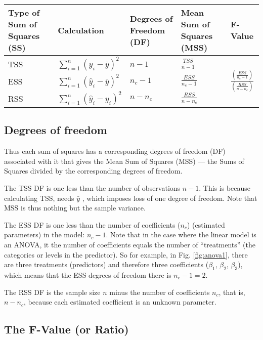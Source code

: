 \begin{center}
\def\arraystretch{1.5}
\begin{tabular}{|>{\centering}m{2cm}|>{\centering}m{2.1cm}|>{\centering}m{2cm}|>{\centering}m{2cm}|p{1.5cm}|}
\hline
Type of Sum of Squares (SS)  & Calculation & Degrees of Freedom (DF) & 
Mean Sum of Squares (MSS) & F-Value \\ \hline

TSS & $\sum_{i=1}^{n}(y_i - \bar{y})^2$   & $n-1$ &$\frac{TSS}{n-1}$& 
\multirow{3}{*}{ 
$\frac{\left(\frac{ESS}{n_c-1}\right)}{\left(\frac{RSS}{n-n_c}\right)}$} \\ \cline{1-4}

ESS & $\sum_{i=1}^{n} (\hat{y}_i - \bar{y})^2$ & $n_c-1$ & $\frac{ESS}{n_c-1}$ &  \\ \cline{1-4}

RSS & $\sum_{i=1}^{n} (\hat{y}_i - y_i)^2$ &  $n-n_c$ &  $\frac{RSS}{n-n_c}$ & \\ \hline
\end{tabular}
\end{center}

\subsection{Degrees of freedom}
Thus each sum of squares has a corresponding degrees of freedom (DF) 
associated with it that gives the Mean Sum of Squares (MSS)  --- the Sums of Squares divided by the corresponding degrees of freedom.

The TSS DF is one less than the number of observations $n-1$. This is because calculating TSS, needs $\bar y$ , which imposes loss of one degree of freedom. Note that MSS is thus nothing but the sample variance.

The ESS DF is one less than the number of coefficients ($n_c$) 
(estimated parameters) in the model: $n_c-1$. Note that in the case 
where the linear model is an ANOVA, it the number of coefficients 
equals the number of ``treatments'' (the categories or levels in the 
predictor). So for example, in Fig. \ref{fig:anova1}, there are three 
treatments (predictors) and therefore three coefficients ($\beta_1$, 
$\beta_2$, $\beta_3$), which means that the ESS degrees of freedom 
there is $n_c-1 = 2$. 

The RSS DF is the sample size $n$ minus the number of coefficients $n_c$, that is, $n - n_c$, because each estimated coefficient is an unknown parameter.

\subsection{The F-Value (or Ratio)}

